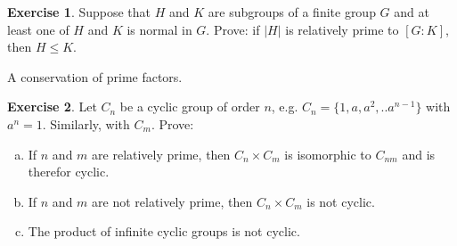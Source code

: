 \documentclass[11pt,oneside]{article}
\numberwithin{equation}{section}
\theoremstyle{definition}
\newtheorem{exercise}{Exercise}
\begin{document}
\begin{exercise}
  Suppose that $H$ and $K$ are subgroups of a finite group $G$ and at
  least one of $H$ and $K$ is normal in $G$.  Prove: if $|H|$ is
  relatively prime to $[G:K]$, then $H \leq K$.
\end{exercise}
\begin{solution}
  A conservation of prime factors.  
\end{solution}

\begin{exercise}
  Let $C_n$ be a cyclic group of order $n$, e.g.
  $C_n = \{1, a, a^2, .. a^{n-1} \}$ with $a^n = 1$.  Similarly, with $C_m$. Prove:
  \begin{enumerate}[(a)]
  \item
    If $n$ and $m$ are relatively prime, then $C_n \times C_m$ is
    isomorphic to $C_{nm}$ and is therefor cyclic.
  \item
    If $n$ and $m$ are not relatively prime, then $C_n \times C_m$ is
    not cyclic.
  \item
    The product of infinite cyclic groups is not cyclic.
  \end{enumerate}
\end{exercise}
\end{document}
